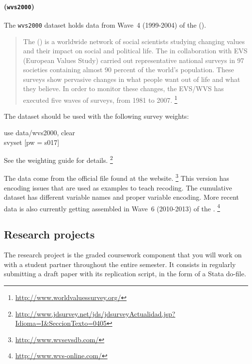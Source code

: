\paragraph{\wvs (\texttt{wvs2000})}

The \texttt{wvs2000} dataset holds data from Wave~4 (1999-2004) of the \wvs (\WVS).

\begin{quote}
	The \wvs (\WVS) is a worldwide network of social scientists studying changing values and their impact on social and political life. The \WVS in collaboration with EVS (European Values Study) carried out representative national surveys in 97 societies containing almost 90 percent of the world's population. These surveys show pervasive changes in what people want out of life and what they believe. In order to monitor these changes, the EVS/WVS has executed five waves of surveys, from 1981 to 2007.%
	\footnote{\url{http://www.worldvaluessurvey.org/}}
\end{quote}

The \WVS dataset should be used with the following survey weights:

\begin{docspec}
	use data/wvs2000, clear\\
	svyset [pw = s017]
\end{docspec}

See the \WVS weighting guide for details.%
  \footnote{\url{http://www.jdsurvey.net/jds/jdsurveyActualidad.jsp?Idioma=I&SeccionTexto=0405}}

The data come from the official file found at the \WVS website.%
   \footnote{\url{http://www.wvsevsdb.com/}} %
   This version has encoding issues that are used as examples to teach recoding. The cumulative dataset has different variable names and proper variable encoding. More recent data is also currently getting assembled in Wave~6 (2010-2013) of the \wvs.%
  \footnote{\url{http://www.wvs-online.com/}}


%
%
\subsection{Research projects}

The research project is the graded coursework component that you will work on with a student partner throughout the entire semester. It consists in regularly submitting a draft paper with its replication script, in the form of a Stata do-file.%

